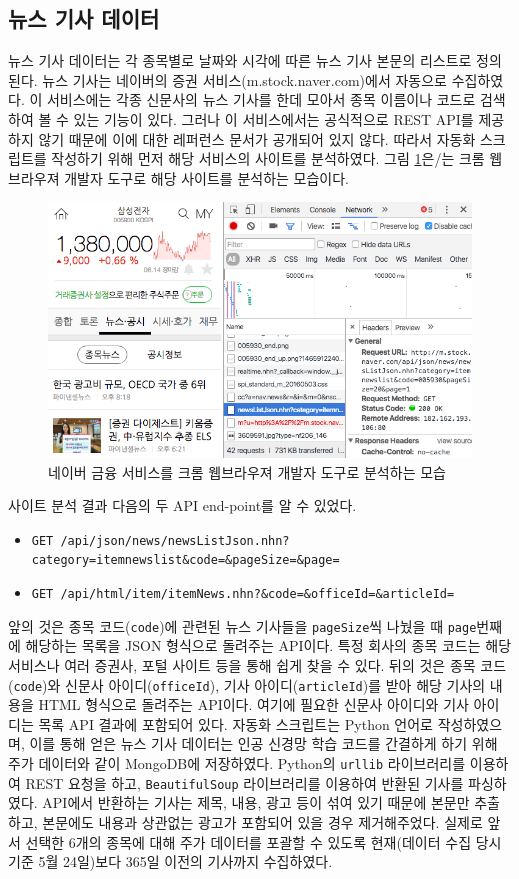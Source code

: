 \documentclass[a4paper,10pt]{article}
\begin{document}
\subsection{뉴스 기사 데이터}

뉴스 기사 데이터는 각 종목별로 날짜와 시각에 따른 뉴스 기사 본문의 리스트로 정의된다.
뉴스 기사는 네이버의 증권 서비스(m.stock.naver.com)에서 자동으로 수집하였다.
이 서비스에는 각종 신문사의 뉴스 기사를 한데 모아서 종목 이름이나 코드로 검색하여 볼 수 있는 기능이 있다.
그러나 이 서비스에서는 공식적으로 REST API를 제공하지 않기 때문에 이에 대한 레퍼런스 문서가 공개되어 있지 않다.
따라서 자동화 스크립트를 작성하기 위해 먼저 해당 서비스의 사이트를 분석하였다.
그림 \ref{fig:naver_stock}은/는 크롬 웹브라우져 개발자 도구로 해당 사이트를 분석하는 모습이다.
\begin{figure}[h]
\includegraphics[width=\textwidth]{naver_stock}
\centering
\caption{네이버 금융 서비스를 크롬 웹브라우져 개발자 도구로 분석하는 모습}
\label{fig:naver_stock}
\end{figure}
사이트 분석 결과 다음의 두 API end-point를 알 수 있었다.
\begin{itemize}
\item \texttt{GET /api/json/news/newsListJson.nhn?category=itemnewslist\&code=\&pageSize=\&page=}
\item \texttt{GET /api/html/item/itemNews.nhn?\&code=\&officeId=\&articleId=}
\end{itemize}
앞의 것은 종목 코드(\texttt{code})에 관련된 뉴스 기사들을 \texttt{pageSize}씩 나눴을 때 \texttt{page}번째에 해당하는 목록을 JSON 형식으로 돌려주는 API이다.
특정 회사의 종목 코드는 해당 서비스나 여러 증권사, 포털 사이트 등을 통해 쉽게 찾을 수 있다.
뒤의 것은 종목 코드(\texttt{code})와 신문사 아이디(\texttt{officeId}), 기사 아이디(\texttt{articleId})를 받아 해당 기사의 내용을 HTML 형식으로 돌려주는 API이다.
여기에 필요한 신문사 아이디와 기사 아이디는 목록 API 결과에 포함되어 있다.
자동화 스크립트는 Python 언어로 작성하였으며, 이를 통해 얻은 뉴스 기사 데이터는 인공 신경망 학습 코드를 간결하게 하기 위해 주가 데이터와 같이 MongoDB에 저장하였다.
Python의 \texttt{urllib} 라이브러리를 이용하여 REST 요청을 하고, \texttt{BeautifulSoup} 라이브러리를 이용하여 반환된 기사를 파싱하였다.
API에서 반환하는 기사는 제목, 내용, 광고 등이 섞여 있기 때문에 본문만 추출하고, 본문에도 내용과 상관없는 광고가 포함되어 있을 경우 제거해주었다.
실제로 앞서 선택한 6개의 종목에 대해 주가 데이터를 포괄할 수 있도록 현재(데이터 수집 당시 기준 5월 24일)보다 365일 이전의 기사까지 수집하였다.
\end{document}
